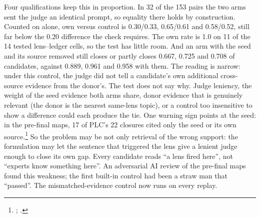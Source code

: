 Four qualifications keep this in proportion. In 32 of the 153 pairs the two arms sent the judge an
identical prompt, so equality there holds by construction. Counted on  alone, own versus
control is 0.30/0.33, 0.65/0.61 and 0.58/0.52, still far below the 0.20 difference the check requires.
The own rate is 1.0 on 11 of the 14 tested lens--ledger cells, so the test has little room. And an arm
with the seed and its source removed still closes or partly closes 0.667, 0.725 and 0.708 of
candidates, against 0.889, 0.961 and 0.958 with them. \evint{} The reading is narrow: under this
control, the judge did not tell a candidate's own additional cross-source evidence from the donor's. The
test does not say why. Judge leniency, the weight of the seed evidence both arms share, donor evidence
that is genuinely relevant (the donor is the nearest same-lens topic), or a control too insensitive to
show a difference could each produce the tie. \evobs{} One warning sign points at the seed: in the
pre-final maps, 17 of PLC's 22 closures cited only the seed or its own
source.\footnote{; .} \evint{} So the problem
may be not only retrieval of the wrong support: the formulation may let the sentence that triggered the
lens give a lenient judge enough to close its own gap. Every candidate reads \enquote{a lens fired
here}, not \enquote{experts know something here}. \evobs{} An adversarial AI review of the pre-final
maps found this weakness; the first built-in control had been a straw man that \enquote{passed}. The
mismatched-evidence control now runs on every replay.

